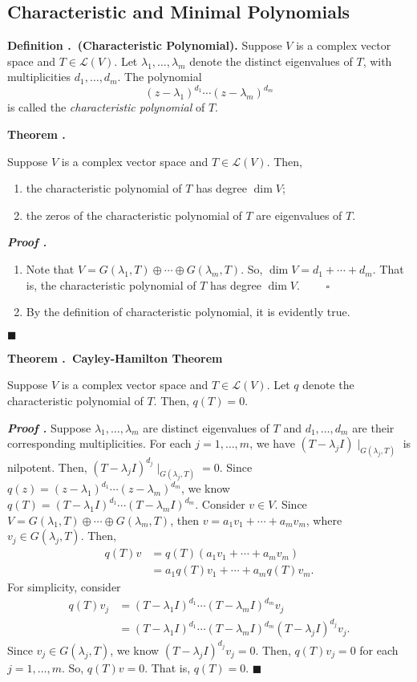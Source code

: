 \documentclass[11pt, letterpaper]{article}
\newcounter{index}[subsection]
\newenvironment*{df}[1]{\par\noindent\textbf{Definition \thesubsection.\stepcounter{index}\theindex\ (#1).}}{\par}
\newenvironment*{thm}[1]{\begin{tcolorbox}\par\noindent\textbf{Theorem \thesubsection.\stepcounter{index}\theindex\ #1} \par}{\par\end{tcolorbox}}
\newcounter{nprf}[subsection]
\newenvironment*{prf}{\par\indent\textbf{\textit{Proof \stepcounter{nprf}\thenprf.}}}{\hfill$\blacksquare$\par}
\def\L{\mathcal{L}}
\def\pqde{\qquad\square}
\begin{document}
\subsection{Characteristic and Minimal Polynomials}
\begin{df}{Characteristic Polynomial}
	Suppose $V$ is a complex vector space and $T\in\L(V)$. Let $\lambda_1,\dots,\lambda_m$ denote the distinct eigenvalues of $T$, with multiplicities $d_1,\dots,d_m$. The polynomial \[(z-\lambda_1)^{d_1}\cdots(z-\lambda_m)^{d_m}\]	is called the \textit{characteristic polynomial} of $T$. 
\end{df}
\begin{thm}{}
	Suppose $V$ is a complex vector space and $T\in\L(V)$. Then, 
	\begin{enumerate}
		\item the characteristic polynomial of $T$ has degree $\dim V$;
		\item the zeros of the characteristic polynomial of $T$ are eigenvalues of $T$. 
	\end{enumerate}
\end{thm}
\begin{prf}
	\begin{enumerate}
		\item Note that $V=G(\lambda_1,T)\oplus\cdots\oplus G(\lambda_m,T)$. So, $\dim V=d_1+\cdots+d_m$. That is, the characteristic polynomial of $T$ has degree $\dim V$. $\pqde$
		\item By the definition of characteristic polynomial, it is evidently true. 
	\end{enumerate}	
\end{prf}
\begin{thm}{Cayley-Hamilton Theorem}
	Suppose $V$ is a complex vector space and $T\in\L(V)$. Let $q$ denote the characteristic polynomial of $T$. Then, $q(T)=0$.
\end{thm}
\begin{prf}
	Suppose $\lambda_1,\dots,\lambda_m$ are distinct eigenvalues of $T$ and $d_1,\dots,d_m$ are their corresponding multiplicities. For each $j=1,\dots,m$, we have $(T-\lambda_jI)\mid_{G(\lambda_j,T)}$ is nilpotent. Then, $(T-\lambda_jI)^{d_j}\mid_{G(\lambda_j,T)}=0$. Since $q(z)=(z-\lambda_1)^{d_1}\cdots(z-\lambda_m)^{d_m}$, we know $q(T)=(T-\lambda_1I)^{d_1}\cdots(T-\lambda_mI)^{d_m}$. Consider $v\in V$. Since $V=G(\lambda_1,T)\oplus\cdots\oplus G(\lambda_m, T)$, then $v=a_1v_1+\cdots+a_mv_m$, where $v_j\in G(\lambda_j,T)$. Then, \[\begin{aligned}q(T)v&=q(T)(a_1v_1+\cdots+a_mv_m)\\&=a_1q(T)v_1+\cdots+a_mq(T)v_m.\end{aligned}\] For simplicity, consider \[\begin{aligned}q(T)v_j&=(T-\lambda_1I)^{d_1}\cdots(T-\lambda_mI)^{d_m}v_j\\&=(T-\lambda_1I)^{d_1}\cdots(T-\lambda_mI)^{d_m}(T-\lambda_jI)^{d_j}v_j.\end{aligned}\] Since $v_j\in G(\lambda_j, T)$, we know $(T-\lambda_jI)^{d_j}v_j=0$. Then, $q(T)v_j=0$ for each $j=1,\dots,m$. So, $q(T)v=0$. That is, $q(T)=0$.
\end{prf}
\end{document}
